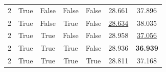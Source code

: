 \begin{table}[ht]
\begin{tabular*}{\linewidth}{@{\extracolsep{\fill}}ccccccc@{}}
        2                          & True                       & False                & False & False & 28.661          & 37.896          \\
        2                          & True                       & False                & True  & False & \underline{28.634} & 38.035          \\
        2                          & True                       & True                 & False & False & 28.958          & \underline{37.056} \\
        2                          & True                       & True                 & True  & False & 28.936          & \textbf{36.939} \\
        2                          & True                       & True                 & True  & True  & 28.811          & 37.168          \\
        \bottomrule
    \end{tabular*}
\end{table}

